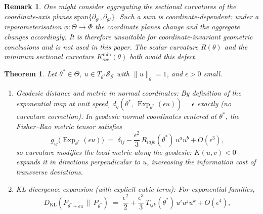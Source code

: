 \documentclass[a4paper,fleqn]{cas-dc}
\newtheorem{theorem}{Theorem}
\newtheorem{remark}{Remark}
\DeclareMathOperator{\Exp}{Exp}
\newcommand{\calS}{\mathcal{S}}
\newcommand{\calG}{\mathcal{G}}
\newcommand{\DKL}{D_{\mathrm{KL}}}
\begin{document}
\begin{remark}%
  \label{rem:no_coord_V}
  One might consider aggregating the sectional curvatures of the
  coordinate-axis planes $\mathrm{span}\{\partial_{\theta^i}, \partial_{\theta^j}\}$.
  Such a sum is \emph{coordinate-dependent}: under a reparameterisation
  $\phi:\Theta\to\Phi$ the coordinate planes change and the aggregate
  changes accordingly.
  It is therefore unsuitable for coordinate-invariant geometric conclusions
  and is not used in this paper.
  The scalar curvature $R(\theta)$ and the minimum sectional curvature
  $K_{\sec}^{\min}(\theta)$ both avoid this defect.
\end{remark}

\begin{theorem}%
  \label{thm:curvature_instability}
  Let $\theta^*\in\Theta$, $u\in T_{\theta^*}\calS_{\calG}$ with $\|u\|_g=1$,
  and $\epsilon>0$ small.
  \begin{enumerate}
    \item[(i)] \emph{Geodesic distance and metric in normal coordinates:}
          By definition of the exponential map at unit speed,
          $d_g(\theta^*,\,\Exp_{\theta^*}(\epsilon u)) = \epsilon$ \emph{exactly}
          (no curvature correction).
          In geodesic normal coordinates centered at $\theta^*$, the Fisher--Rao
          metric tensor satisfies
          \begin{equation}
            g_{ij}\!\bigl(\Exp_{\theta^*}(\epsilon u)\bigr)
            \;=\; \delta_{ij}
            - \frac{\epsilon^2}{3}\,R_{iajb}(\theta^*)\,u^a u^b
            + O(\epsilon^3),
            \label{eq:metric_normal_coords}
          \end{equation}
          so curvature modifies the local metric along the geodesic:
          $K(u,v)<0$ expands it in directions perpendicular to $u$,
          increasing the information cost of transverse deviations.
    \item[(ii)] \emph{KL divergence expansion (with explicit cubic term):}
          For exponential families,
          \begin{equation}
            \DKL\!\left(P_{\theta^*+\epsilon u} \,\|\, P_{\theta^*}\right)
            \;=\;
            \frac{\epsilon^2}{2}
            +
            \frac{\epsilon^3}{3}\,
            T_{ijk}(\theta^*)\,u^i u^j u^k
            +
            O(\epsilon^4),
            \label{eq:kl_expansion_corrected}
          \end{equation}

\end{enumerate}
\end{theorem}
\end{document}
